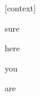 \documentclass[varwidth]{standalone}
\begin{document}
\begin{CJK*}{UTF8}{gbsn}
{\setlength{\fboxsep}{0pt}\colorbox{white!0}{\parbox{0.9\textwidth}{
\colorbox{red!0.04074603319168091}{\strut [context]} \colorbox{red!72.86443328857422}{\strut sure} \colorbox{red!7.0582122802734375}{\strut here} \colorbox{red!2.2619194984436035}{\strut you} \colorbox{red!17.774694442749023}{\strut are} 
}}}
\end{CJK*}
\end{document}
